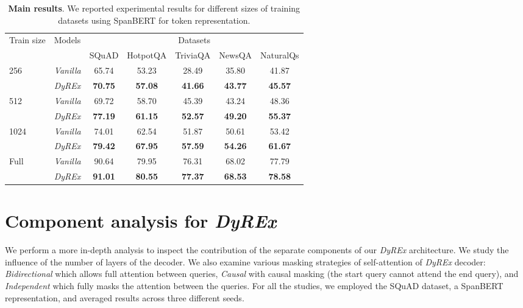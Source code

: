 \documentclass{article}
\begin{document}
\begin{table*}[]
\centering
\begin{tabular}{l|l|ccccc}
\hline
\multirow{2}{*}{Train size} & \multirow{2}{*}{Models} & \multicolumn{5}{c}{Datasets}                 \\ \cline{3-7} 
                          &                         & SQuAD & HotpotQA & TriviaQA & NewsQA & NaturalQs    \\ \hline\hline
\multirow{2}{*}{256} & \textit{Vanilla}                 & 65.74 & 53.23   & 28.49    & 35.80  & 41.87 \\
                          & \textit{DyREx}                    & \textbf{70.75} & \textbf{57.08}    & \textbf{41.66}    & \textbf{43.77}  & \textbf{45.57} \\ \hline
\multirow{2}{*}{512} & \textit{Vanilla}                 & 69.72 & 58.70    & 45.39     & 43.24  & 48.36 \\
                          & \textit{DyREx}                    & \textbf{77.19} & \textbf{61.15}    & \textbf{52.57}    & \textbf{49.20}  & \textbf{55.37} \\ \hline
\multirow{2}{*}{1024} & \textit{Vanilla}                 & 74.01 & 62.54    & 51.87    & 50.61  & 53.42 \\
                          & \textit{DyREx}                    & \textbf{79.42} & \textbf{67.95}    & \textbf{57.59}    & \textbf{54.26}  & \textbf{61.67} \\ \hline
\multirow{2}{*}{Full} & \textit{Vanilla}                 & 90.64 & 79.95    & 76.31    & 68.02  & 77.79 \\
                          & \textit{DyREx}                    & \textbf{91.01} & \textbf{80.55}    & \textbf{77.37}    & \textbf{68.53}  & \textbf{78.58} \\ \hline
\end{tabular}
\caption{\textbf{Main results}. We reported experimental results for different sizes of training datasets using SpanBERT \citep{span_BERT} for token representation.}
\label{tab:main_results}
\end{table*}

\section{Component analysis for \textit{DyREx}}
\label{sec:ablation_study}

We perform a more in-depth analysis to inspect the contribution of the separate components of our \textit{DyREx} architecture. We study the influence of the number of layers of the decoder. We also examine various masking strategies of self-attention of \textit{DyREx} decoder: \textit{Bidirectional} which allows full attention between queries, \textit{Causal} with causal masking (the start query cannot attend the end query), and \textit{Independent} which fully masks the attention between the queries. For all the studies, we employed the SQuAD dataset, a SpanBERT representation, and averaged results across three different seeds.
\end{document}

